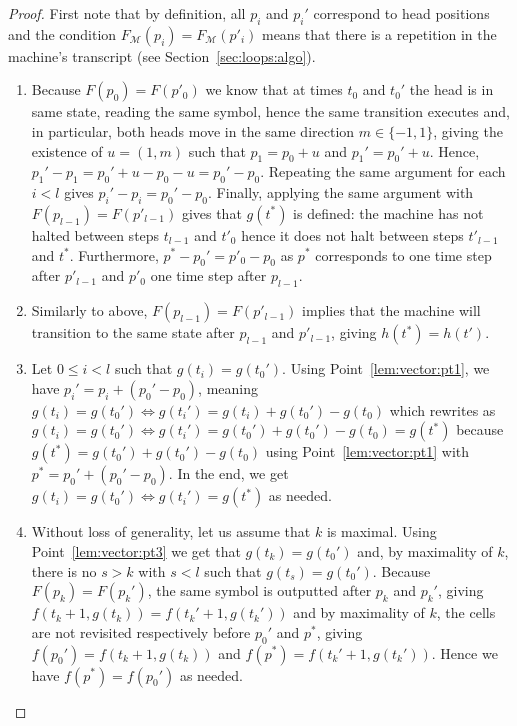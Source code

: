 \begin{proof}
    First note that by definition, all $p_i$ and $p_i'$ correspond to head positions and the condition $F_\mathcal{M}(p_i)   = F_\mathcal{M}(p'_i)$ means that there is a repetition in the machine's transcript (see Section~\ref{sec:loops:algo}).
    \begin{enumerate}
        \item Because $F(p_0) = F(p'_0)$ we know that at times $t_0$ and $t_0'$ the head is in same state, reading the same symbol, hence the same transition executes and, in particular, both heads move in the same direction $m \in \{-1,1\}$, giving the existence of $u = (1, m)$ such that $p_1 = p_0 + u$ and $p_1' = p_0' + u$. Hence, $p_1' - p_1 = p_0' + u - p_0 - u = p_0' - p_0$. Repeating the same argument for each $i < l$ gives $p_i' - p_i = p_0' - p_0$. Finally, applying the same argument with $F(p_{l-1}) = F(p'_{l-1})$ gives that $g(t^*)$ is defined: the machine has not halted between steps $t_{l-1}$ and $t'_0$ hence it does not halt between steps $t'_{l-1}$ and $t^*$. Furthermore, $p^*-p_0' = p'_0 - p_0$ as $p^*$ corresponds to one time step after $p'_{l-1}$ and $p'_0$ one time step after $p_{l-1}$.
        \item Similarly to above, $F(p_{l-1}) = F(p'_{l-1})$ implies that the machine will transition to the same state after $p_{l-1}$ and $p'_{l-1}$, giving $h(t^*) = h(t')$.

        \item Let $0 \leq i < l$ such that $g(t_i) = g(t_0')$. Using Point~\ref{lem:vector:pt1}, we have $p_i' = p_i + (p_0' - p_0)$, meaning $g(t_i) = g(t_0') \Leftrightarrow g(t_i') = g(t_i) + g(t_0') - g(t_0)$ which rewrites as $g(t_i) = g(t_0') \Leftrightarrow g(t_i') = g(t_0') + g(t_0') - g(t_0) = g(t^*)$ because $g(t^*) = g(t_0') + g(t_0') - g(t_0)$ using Point~\ref{lem:vector:pt1} with $p^* = p_0' + (p_0' - p_0)$. In the end, we get $g(t_i) = g(t_0') \Leftrightarrow g(t_i') = g(t^*)$ as needed.

        \item Without loss of generality, let us assume that $k$ is maximal. Using Point~\ref{lem:vector:pt3} we get that $g(t_k) = g(t_0')$ and, by maximality of $k$, there is no $s > k$ with $s <l$ such that $g(t_s) = g(t_0')$. Because $F(p_k) = F(p_k')$, the same symbol is outputted after $p_k$ and $p_k'$, giving $f(t_k+1,g(t_k)) = f(t_k'+1,g(t_k'))$ and by maximality of $k$, the cells are not revisited respectively before $p_0'$ and $p^*$, giving $f(p_0') = f(t_k+1,g(t_k))$ and $f(p^*) = f(t_k'+1,g(t_k'))$. Hence we have $f(p^*) = f(p_0')$ as needed.


    \end{enumerate}

\end{proof}

